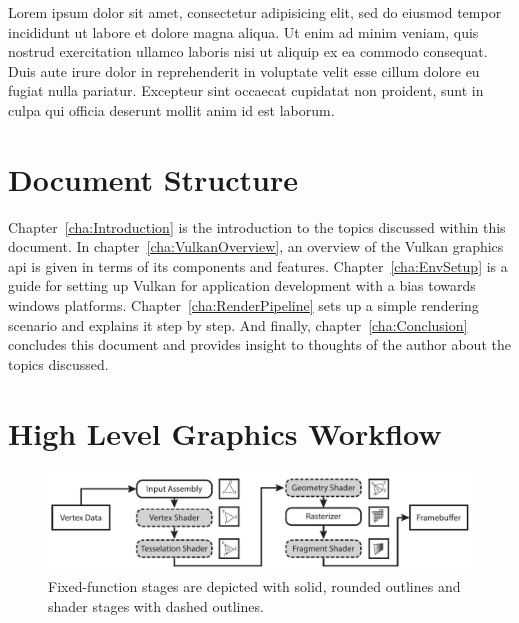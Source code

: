   Lorem ipsum dolor sit amet, consectetur adipisicing elit, sed do eiusmod
  tempor incididunt ut labore et dolore magna aliqua. Ut enim ad minim veniam,
  quis nostrud exercitation ullamco laboris nisi ut aliquip ex ea commodo
  consequat. Duis aute irure dolor in reprehenderit in voluptate velit esse
  cillum dolore eu fugiat nulla pariatur. Excepteur sint occaecat cupidatat non
  proident, sunt in culpa qui officia deserunt mollit anim id est laborum.


  \section{Document Structure}
    Chapter~\ref{cha:Introduction} is the introduction to the topics discussed within this document.
    In chapter~\ref{cha:VulkanOverview}, an overview of the Vulkan graphics \gls{api} is given in terms of its components and features.
    Chapter~\ref{cha:EnvSetup} is a guide for setting up Vulkan for application development with a bias towards \gls{windows} platforms.
    Chapter~\ref{cha:RenderPipeline} sets up a simple rendering scenario and explains it step by step.
    And finally, chapter~\ref{cha:Conclusion} concludes this document and provides insight to thoughts of the author about the topics discussed.


  \section{High Level Graphics Workflow}
    \label{sec:GraphicsWorkflow}

    \begin{figure}
      \includegraphics[width=\textwidth]{Main/Images/Rendering_Pipeline_Overview}
      \centering
      \caption{Fixed-function stages are depicted with solid, rounded outlines and shader stages with dashed outlines.}
      \label{fig:Rendering_Pipeline_Overview}
    \end{figure}

